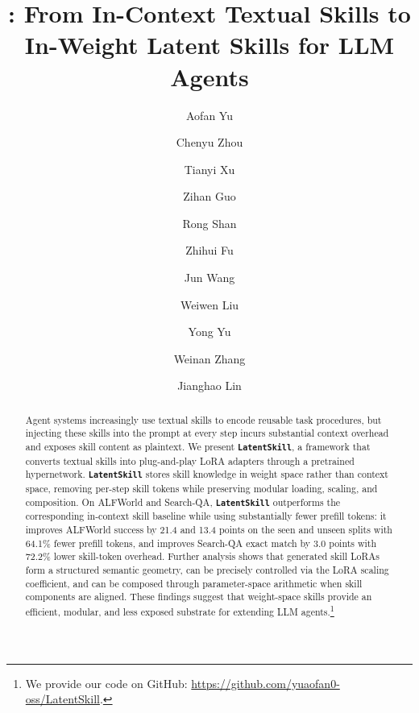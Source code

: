 \documentclass{llmxive}
\title{\method{}: From In-Context Textual Skills to In-Weight Latent Skills for LLM Agents}
\author{Aofan Yu \and Chenyu Zhou \and Tianyi Xu \and Zihan Guo \and Rong Shan \and Zhihui Fu \and Jun Wang \and Weiwen Liu \and Yong Yu \and Weinan Zhang \and Jianghao Lin}
\providecommand{\textttt}[1]{\texttt{#1}}
\providecommand{\method}{\textbf{\textttt{LatentSkill}}}
\begin{document}
\maketitle
\begin{abstract}
Agent systems increasingly use textual skills to encode reusable task procedures, but injecting these skills into the prompt at every step incurs substantial context overhead and exposes skill content as plaintext. We present \textbf{\method{}}, a framework that converts textual skills into plug-and-play LoRA adapters through a pretrained hypernetwork. \method{} stores skill knowledge in weight space rather than context space, removing per-step skill tokens while preserving modular loading, scaling, and composition. On ALFWorld and Search-QA, \method{} outperforms the corresponding in-context skill baseline while using substantially fewer prefill tokens: it improves ALFWorld success by 21.4 and 13.4 points on the seen and unseen splits with 64.1\% fewer prefill tokens, and improves Search-QA exact match by 3.0 points with 72.2\% lower skill-token overhead. Further analysis shows that generated skill LoRAs form a structured semantic geometry, can be precisely controlled via the LoRA scaling coefficient, and can be composed through parameter-space arithmetic when skill components are aligned. 
These findings suggest that weight-space skills provide an efficient, modular, and less exposed substrate for extending LLM agents.\footnote{We provide our code on GitHub: \url{https://github.com/yuaofan0-oss/LatentSkill}.}
\end{abstract}
\end{document}
